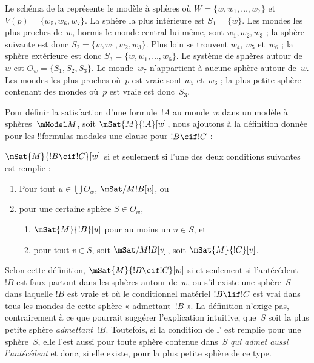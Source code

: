 \documentclass[../../../include/open-logic-section]{subfiles}
\begin{document}
Le schéma de la  représente le modèle à
sphères où $W = \{w, w_1, \dots, w_7\}$ et $V(p) = \{w_5, w_6,
w_7\}$. La sphère la plus intérieure est $S_1 = \{w\}$. Les mondes
les plus proches de~$w$, hormis le monde central lui-même, sont
$w_1, w_2, w_3$ ; la sphère suivante est donc
$S_2 = \{w, w_1, w_2, w_3\}$. Plus loin se
trouvent $w_4$, $w_5$ et~$w_6$ ; la sphère extérieure est donc
$S_3 = \{w, w_1, \dots, w_6\}$. Le système de sphères autour de~$w$
est $O_w = \{S_1, S_2, S_3\}$. Le monde~$w_7$ n'appartient à aucune
sphère autour de~$w$. Les mondes les plus proches où~$p$ est vraie
sont $w_5$ et~$w_6$ ; la plus petite sphère contenant des mondes
où~$p$ est vraie est donc~$S_3$.

Pour définir la satisfaction d'une formule~$!A$ au monde~$w$ dans un
modèle à sphères~$\mModel M$, soit $\mSat{M}{!A}[w]$, nous ajoutons à
la définition donnée pour les !!{formula}s modales une clause pour
$!B \cif !C$ :

\begin{defn}
  $\mSat{M}{!B \cif !C}[w]$ si et seulement si l'une des deux
  conditions suivantes est remplie :
  \begin{enumerate}
  \item{} Pour tout $u \in \bigcup O_w$,
    $\mSat/{M}{!B}[u]$, ou
  \item{} pour une certaine sphère $S \in O_w$,
    \begin{enumerate}
      \item $\mSat{M}{!B}[u]$ pour au moins un $u \in S$, et
      \item pour tout $v \in S$, soit $\mSat/{M}{!B}[v]$, soit
        $\mSat{M}{!C}[v]$.
    \end{enumerate}
  \end{enumerate}
\end{defn}

Selon cette définition, $\mSat{M}{!B \cif !C}[w]$ si et seulement si
l'antécédent~$!B$ est faux partout dans les sphères autour de~$w$,
ou s'il existe une sphère~$S$ dans laquelle $!B$ est vraie et où le
conditionnel matériel $!B \lif !C$ est vrai dans tous les mondes de
cette sphère « admettant~$!B$ ». La définition n'exige pas, contrairement
à ce que pourrait suggérer l'explication intuitive, que~$S$ soit la
plus petite sphère \emph{admettant~$!B$}. Toutefois, si la condition
de l' est remplie pour une sphère~$S$, elle
l'est aussi pour toute sphère contenue dans~$S$ \emph{qui admet
  aussi l'antécédent} et donc, si elle existe, pour la plus petite sphère de
ce type.
\end{document}
